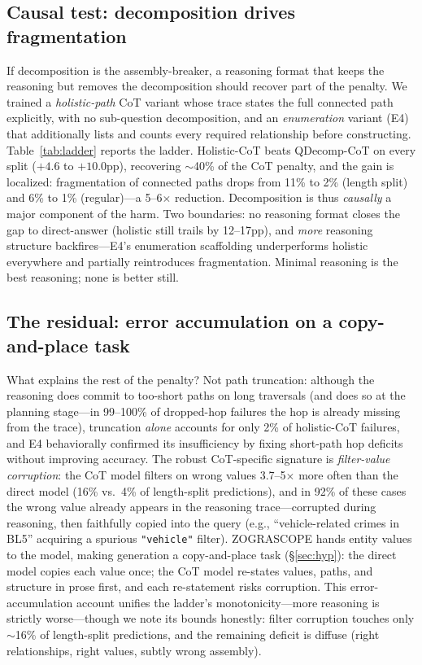 \documentclass[11pt]{article}
\begin{document}
\subsection{Causal test: decomposition drives fragmentation}
If decomposition is the assembly-breaker, a reasoning format that keeps the reasoning but removes the
decomposition should recover part of the penalty. We trained a \emph{holistic-path} CoT variant whose
trace states the full connected path explicitly, with no sub-question decomposition, and an
\emph{enumeration} variant (E4) that additionally lists and counts every required relationship before
constructing. Table~\ref{tab:ladder} reports the ladder. Holistic-CoT beats QDecomp-CoT on every
split ($+4.6$ to $+10.0$pp), recovering $\sim$40\% of the CoT penalty, and the gain is localized:
fragmentation of connected paths drops from 11\% to 2\% (length split) and 6\% to 1\% (regular)---a
5--6$\times$ reduction. Decomposition is thus \emph{causally} a major component of the harm. Two
boundaries: no reasoning format closes the gap to direct-answer (holistic still trails by 12--17pp),
and \emph{more} reasoning structure backfires---E4's enumeration scaffolding underperforms holistic
everywhere and partially reintroduces fragmentation. Minimal reasoning is the best reasoning; none is
better still.

\subsection{The residual: error accumulation on a copy-and-place task}
What explains the rest of the penalty? Not path truncation: although the reasoning does commit to
too-short paths on long traversals (and does so at the planning stage---in 99--100\% of dropped-hop
failures the hop is already missing from the trace), truncation \emph{alone} accounts for only 2\% of
holistic-CoT failures, and E4 behaviorally confirmed its insufficiency by fixing short-path hop
deficits without improving accuracy. The robust CoT-specific signature is \emph{filter-value
corruption}: the CoT model filters on wrong values 3.7--5$\times$ more often than the direct model
(16\% vs.\ 4\% of length-split predictions), and in 92\% of these cases the wrong value already
appears in the reasoning trace---corrupted during reasoning, then faithfully copied into the query
(e.g., ``vehicle-related crimes in BL5'' acquiring a spurious \texttt{"vehicle"} filter). ZOGRASCOPE
hands entity values to the model, making generation a copy-and-place task (\S\ref{sec:hyp}): the
direct model copies each value once; the CoT model re-states values, paths, and structure in prose
first, and each re-statement risks corruption. This error-accumulation account unifies the ladder's
monotonicity---more reasoning is strictly worse---though we note its bounds honestly: filter
corruption touches only $\sim$16\% of length-split predictions, and the remaining deficit is diffuse
(right relationships, right values, subtly wrong assembly).
\end{document}
